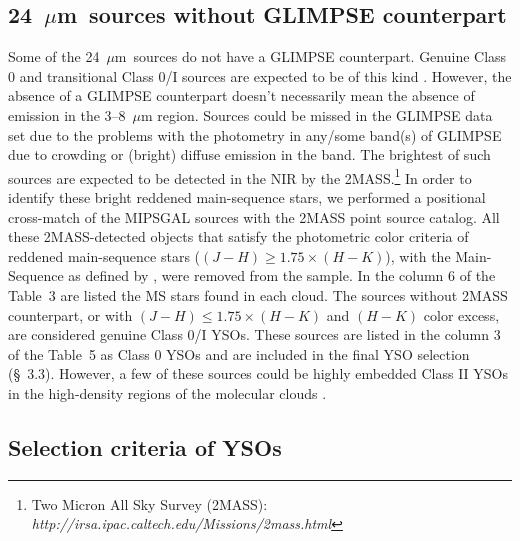 \documentclass[iop]{emulateapj}
\newcommand{\mipslam}{24~$\mu$m}
\begin{document}
\subsection{\mipslam ~sources without GLIMPSE counterpart}

Some of the \mipslam ~sources do not have a GLIMPSE counterpart. 
Genuine Class 0 and transitional Class 0/I sources are expected to be
of this kind \citep{andre+10}. However, the absence of a GLIMPSE counterpart doesn't
necessarily mean the absence of emission in the 3--8~$\mu$m region.
Sources could be missed in the GLIMPSE data set due to the
problems with the photometry in any/some band(s) of GLIMPSE due to 
crowding or (bright) diffuse emission in the band. The brightest of 
such sources are expected to be detected in the NIR by the 
2MASS.\footnote{Two Micron All Sky Survey (2MASS):
{\it http://irsa.ipac.caltech.edu/Missions/2mass.html}}
In order to identify these bright reddened main-sequence stars,
we performed a positional cross-match of the MIPSGAL 
sources with the 2MASS point source catalog. 
All these 2MASS-detected objects that satisfy the photometric color 
criteria of reddened main-sequence stars
($(J-H)\geq1.75\times(H-K)$), with the Main-Sequence as defined by
\citet{bessell+brett}, were removed from the sample. 
In the column 6 of the Table~3 are listed the MS stars found in each cloud.  
The sources without 2MASS counterpart, or with $(J-H)\leq1.75\times(H-K)$ 
and $(H-K)$ color excess, are considered genuine Class 0/I YSOs. 
These sources are listed in the column 3 of the Table~5 as Class 0 YSOs 
and are included in the final YSO selection (\S~3.3). 
However, a few of these sources could be highly embedded Class II YSOs
in the high-density regions of the molecular clouds \citep{megeath+12}.

\subsection{Selection criteria of YSOs}
\end{document}
